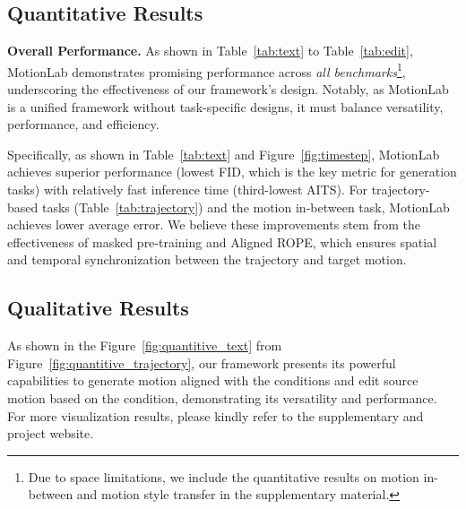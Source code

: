 \subsection{Quantitative Results}

\textbf{Overall Performance.} 
As shown in Table~\ref{tab:text} to Table~\ref{tab:edit}, MotionLab demonstrates promising performance across \textit{all benchmarks}\footnote{Due to space limitations, we include the quantitative results on motion in-between and motion style transfer in the supplementary material.}, underscoring the effectiveness of our framework's design. Notably, as MotionLab is a unified framework without task-specific designs, it must balance versatility, performance, and efficiency. 

Specifically, as shown in Table~\ref{tab:text} and Figure~\ref{fig:timestep}, MotionLab achieves superior performance (lowest FID, which is the key metric for generation tasks) with relatively fast inference time (third-lowest AITS). For trajectory-based tasks (Table~\ref{tab:trajectory}) and the motion in-between task, MotionLab achieves lower average error. We believe these improvements stem from the effectiveness of masked pre-training and Aligned ROPE, which ensures spatial and temporal synchronization between the trajectory and target motion. 

\subsection{Qualitative Results}

As shown in the Figure~\ref{fig:quantitive_text} from Figure~\ref{fig:quantitive_trajectory}, our framework presents its powerful capabilities to generate motion aligned with the conditions and edit source motion based on the condition, demonstrating its versatility and performance. For more visualization results, please kindly refer to the supplementary and project website.

